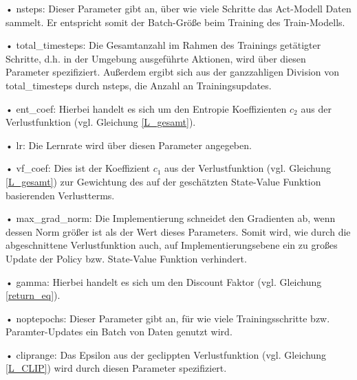 \begin{description}
	\item • nsteps: Dieser Parameter gibt an, über wie viele Schritte das Act-Modell Daten sammelt. Er entspricht somit der Batch-Größe beim Training des Train-Modells.
	\item • total\_timesteps: Die Gesamtanzahl im Rahmen des Trainings getätigter Schritte, d.h. in der Umgebung ausgeführte Aktionen, wird über diesen Parameter spezifiziert. Außerdem ergibt sich aus der ganzzahligen Division von total\_timesteps durch nsteps, die Anzahl an Trainingsupdates.
	\item • ent\_coef: Hierbei handelt es sich um den Entropie Koeffizienten $c_2$ aus der Verlustfunktion (vgl. Gleichung \eqref{L_gesamt}).
	\item • lr: Die Lernrate wird über diesen Parameter angegeben.
	\item • vf\_coef: Dies ist der Koeffizient $c_1$ aus der Verlustfunktion (vgl. Gleichung \eqref{L_gesamt}) zur Gewichtung des auf der geschätzten State-Value Funktion basierenden Verlustterms.
	\item • max\_grad\_norm: Die Implementierung schneidet den Gradienten ab, wenn dessen Norm größer ist als der Wert dieses Parameters. Somit wird, wie durch die abgeschnittene Verlustfunktion auch, auf Implementierungsebene ein zu großes Update der Policy bzw. State-Value Funktion verhindert.
	\item • gamma: Hierbei handelt es sich um den Discount Faktor (vgl. Gleichung \eqref{return_eq}).
	\item • noptepochs: Dieser Parameter gibt an, für wie viele Trainingsschritte bzw. Paramter-Updates ein Batch von Daten genutzt wird.
	\item • cliprange: Das Epsilon aus der  geclippten Verlustfunktion (vgl. Gleichung \eqref{L_CLIP}) wird durch diesen Parameter spezifiziert.
\end{description}

